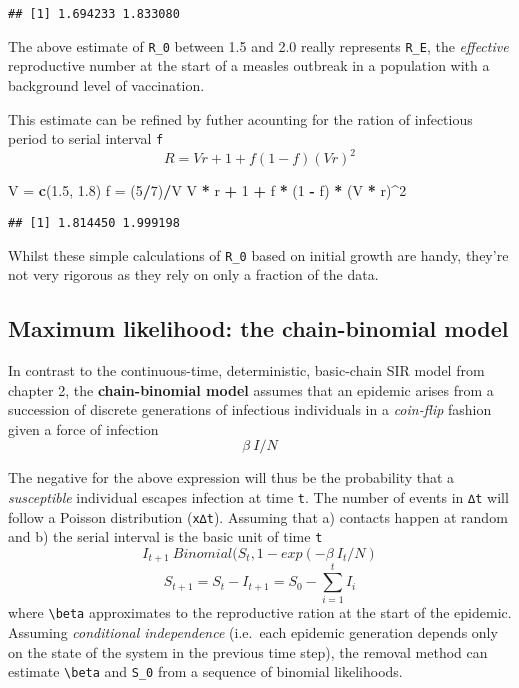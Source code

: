 \documentclass[]{article}
\newenvironment{Shaded}{\begin{snugshade}}{\end{snugshade}}
\newcommand{\DecValTok}[1]{\textcolor[rgb]{0.00,0.00,0.81}{#1}}
\newcommand{\FloatTok}[1]{\textcolor[rgb]{0.00,0.00,0.81}{#1}}
\newcommand{\KeywordTok}[1]{\textcolor[rgb]{0.13,0.29,0.53}{\textbf{#1}}}
\newcommand{\NormalTok}[1]{#1}
\newcommand{\OperatorTok}[1]{\textcolor[rgb]{0.81,0.36,0.00}{\textbf{#1}}}
\newcommand{\StringTok}[1]{\textcolor[rgb]{0.31,0.60,0.02}{#1}}
\begin{document}
\begin{verbatim}
## [1] 1.694233 1.833080
\end{verbatim}

The above estimate of \texttt{R\_0} between 1.5 and 2.0 really
represents \texttt{R\_E}, the \emph{effective} reproductive number at
the start of a measles outbreak in a population with a background level
of vaccination.

This estimate can be refined by futher acounting for the ration of
infectious period to serial interval \texttt{f}
\[R = Vr + 1 + f(1-f)(Vr)^2\]

\begin{Shaded}
\begin{Highlighting}[]
\NormalTok{V =}\StringTok{ }\KeywordTok{c}\NormalTok{(}\FloatTok{1.5}\NormalTok{, }\FloatTok{1.8}\NormalTok{)}
\NormalTok{f =}\StringTok{ }\NormalTok{(}\DecValTok{5}\OperatorTok{/}\DecValTok{7}\NormalTok{)}\OperatorTok{/}\NormalTok{V}
\NormalTok{V }\OperatorTok{*}\StringTok{ }\NormalTok{r }\OperatorTok{+}\StringTok{ }\DecValTok{1} \OperatorTok{+}\StringTok{ }\NormalTok{f }\OperatorTok{*}\StringTok{ }\NormalTok{(}\DecValTok{1} \OperatorTok{-}\StringTok{ }\NormalTok{f) }\OperatorTok{*}\StringTok{ }\NormalTok{(V }\OperatorTok{*}\StringTok{ }\NormalTok{r)}\OperatorTok{^}\DecValTok{2}
\end{Highlighting}
\end{Shaded}

\begin{verbatim}
## [1] 1.814450 1.999198
\end{verbatim}

Whilst these simple calculations of \texttt{R\_0} based on initial
growth are handy, they're not very rigorous as they rely on only a
fraction of the data.

\hypertarget{maximum-likelihood-the-chain-binomial-model}{%
\subsection{Maximum likelihood: the chain-binomial
model}\label{maximum-likelihood-the-chain-binomial-model}}

In contrast to the continuous-time, deterministic, basic-chain SIR model
from chapter 2, the \textbf{chain-binomial model} assumes that an
epidemic arises from a succession of discrete generations of infectious
individuals in a \emph{coin-flip} fashion given a force of infection
\[\beta\ I/N\]

The negative for the above expression will thus be the probability that
a \emph{susceptible} individual escapes infection at time \texttt{t}.
The number of events in \texttt{∆t} will follow a Poisson distribution
(\texttt{x∆t}). Assuming that a) contacts happen at random and b) the
serial interval is the basic unit of time \texttt{t}
\[I_{t+1} ~ Binomial(S_t, 1 - exp(-\beta\ I_t / N)\]
\[S_{t+1} = S_t - I_{t+1} = S_0 - \sum_{i=1}^t I_i\] where
\texttt{\textbackslash{}beta} approximates to the reproductive ration at
the start of the epidemic. Assuming \emph{conditional independence}
(i.e.~each epidemic generation depends only on the state of the system
in the previous time step), the removal method can estimate
\texttt{\textbackslash{}beta} and \texttt{S\_0} from a sequence of
binomial likelihoods.
\end{document}
